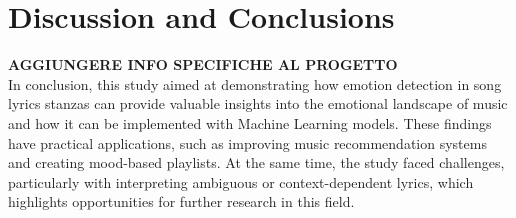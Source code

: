 \chapter*{Discussion and Conclusions}
\label{ch:conclusioni}

\textbf{AGGIUNGERE INFO SPECIFICHE AL PROGETTO}\\

In conclusion, this study aimed at demonstrating how emotion detection in song lyrics stanzas can provide valuable insights into the emotional landscape of music and how it can be implemented with Machine Learning models. 
These findings have practical applications, such as improving music recommendation systems and creating mood-based playlists. 
At the same time, the study faced challenges, particularly with interpreting ambiguous or context-dependent lyrics, which highlights opportunities for further research in this field.